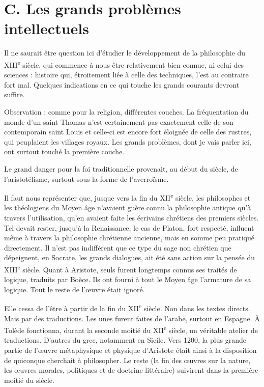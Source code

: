 \documentclass[french,twoside]{book} %
\begin{document}
\section[C. Les grands problèmes intellectuels]{C. Les grands problèmes intellectuels \protect\footnotemark}
\label{c11c}
\noindent Il ne saurait être question ici d’étudier le développement de la philosophie du XIII\textsuperscript{e} siècle, qui commence à nous être relativement bien connue, ni celui des sciences : histoire qui, étroitement liée à celle des techniques, l’est au contraire fort mal. Quelques indications en ce qui touche les grands courants devront suffire.\par
Observation : comme pour la religion, différentes couches. La fréquentation du monde d’un saint Thomas n’est certainement pas exactement celle de son contemporain saint Louis et celle-ci est encore fort éloignée de celle des rustres, qui peuplaient les villages royaux. Les grands problèmes, dont je vais parler ici, ont surtout touché la première couche.\par
Le grand danger pour la foi traditionnelle provenait, au début du siècle, de l’aristotélisme, surtout sous la forme de l’averroïsme.\par
\label{p119} Il faut nous représenter que, jusque vers la fin du XII\textsuperscript{e} siècle, les philosophes et les théologiens du Moyen âge n’avaient guère connu la philosophie antique qu’à travers l’utilisation, qu’en avaient faite les écrivains chrétiens des premiers siècles. Tel devait rester, jusqu’à la Renaissance, le cas de Platon, fort respecté, influent même à travers la philosophie chrétienne ancienne, mais en somme peu pratiqué directement. Il n’est pas indifférent que ce type du sage non chrétien que dépeignent, en Socrate, les grands dialogues, ait été sans action sur la pensée du XIII\textsuperscript{e} siècle. Quant à Aristote, seuls furent longtemps connus ses traités de logique, traduits par Boèce. Ils ont fourni à tout le Moyen âge l’armature de sa logique. Tout le reste de l’œuvre était ignoré.\par
Elle cessa de l’être à partir de la fin du XII\textsuperscript{e} siècle. Non dans les textes directs. Mais par des traductions. Les unes furent faites de l’arabe, surtout en Espagne. À Tolède fonctionna, durant la seconde moitié du XII\textsuperscript{e} siècle, un véritable atelier de traductions. D’autres du grec, notamment en Sicile. Vers 1200, la plus grande partie de l’œuvre métaphysique et physique d’Aristote était ainsi à la disposition de quiconque cherchait à philosopher. Le reste (la fin des œuvres sur la nature, les œuvres morales, politiques et de doctrine littéraire) suivirent dans la première moitié du siècle.\par
\end{document}
